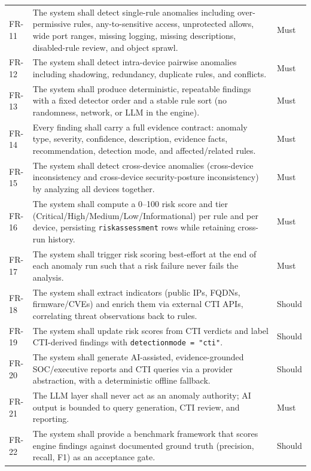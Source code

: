 \documentclass[12pt,a4paper]{report}
\renewcommand{\_}{\textunderscore\allowbreak}
\newcommand{\hrow}{}
\newcommand{\altrow}{}
\begin{document}
\begin{longtable}{C{0.08\textwidth} L{0.70\textwidth} C{0.12\textwidth}}
\hrow FR-11 & The system shall detect single-rule anomalies including over-permissive rules, any-to-sensitive access, unprotected allows, wide port ranges, missing logging, missing descriptions, disabled-rule review, and object sprawl. & Must \\
\altrow FR-12 & The system shall detect intra-device pairwise anomalies including shadowing, redundancy, duplicate rules, and conflicts. & Must \\
\hrow FR-13 & The system shall produce deterministic, repeatable findings with a fixed detector order and a stable rule sort (no randomness, network, or LLM in the engine). & Must \\
\altrow FR-14 & Every finding shall carry a full evidence contract: anomaly type, severity, confidence, description, evidence facts, recommendation, detection mode, and affected/related rules. & Must \\
\hrow FR-15 & The system shall detect cross-device anomalies (cross-device inconsistency and cross-device security-posture inconsistency) by analyzing all devices together. & Must \\
\altrow FR-16 & The system shall compute a 0--100 risk score and tier (Critical/High/Medium/Low/Informational) per rule and per device, persisting \texttt{risk\_assessment} rows while retaining cross-run history. & Must \\
\hrow FR-17 & The system shall trigger risk scoring best-effort at the end of each anomaly run such that a risk failure never fails the analysis. & Must \\
\altrow FR-18 & The system shall extract indicators (public IPs, FQDNs, firmware/CVEs) and enrich them via external CTI APIs, correlating threat observations back to rules. & Should \\
\hrow FR-19 & The system shall update risk scores from CTI verdicts and label CTI-derived findings with \texttt{detection\_mode = "cti"}. & Should \\
\altrow FR-20 & The system shall generate AI-assisted, evidence-grounded SOC/executive reports and CTI queries via a provider abstraction, with a deterministic offline fallback. & Should \\
\hrow FR-21 & The LLM layer shall never act as an anomaly authority; AI output is bounded to query generation, CTI review, and reporting. & Must \\
\altrow FR-22 & The system shall provide a benchmark framework that scores engine findings against documented ground truth (precision, recall, F1) as an acceptance gate. & Should \\

\end{longtable}
\end{document}
